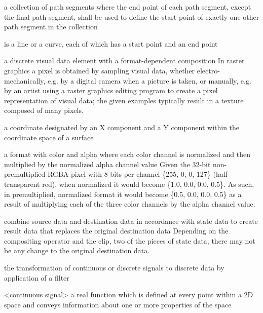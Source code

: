 a collection of path segments where the end point of each path segment, except the final path segment, shall be used to define the start point of exactly one other path segment in the collection

is a line or a curve, each of which has a start point and an end point

a discrete visual data element with a format-dependent composition
\enternote
In raster graphics a pixel is obtained by sampling visual data, whether 
electro-mechanically, e.g. by a digital camera when a picture is taken, or 
manually, e.g. by an artist using a raster graphics editing program to create a 
pixel representation of visual data; the given examples typically result in a 
texture composed of many pixels.
\exitnote

a coordinate designated by an X component and a Y component within the 
coordinate space of a surface

a format with color and alpha where each color channel is normalized and then 
multiplied by the normalized alpha channel value
\enterexample
Given the 32-bit non-premultiplied RGBA pixel with 8 bits per channel \{255, 0, 
0, 127\} (half-transparent red), when normalized it would become \{1.0, 0.0, 
0.0, 0.5\}. As such, in premultiplied, normalized format it would become \{0.5, 
0.0, 0.0, 0.5\} as a result of multiplying each of the three color channels by 
the alpha channel value.
\exitexample

combine source data and destination data in accordance with state data to 
create result data that replaces the original destination data
\enternote
Depending on the compositing operator and the clip, two of the pieces of state 
data, there may not be any change to the original destination data. 
\exitnote

%
the transformation of continuous or discrete signals to discrete 
data by application of a filter

<continuous signal> a real function which is defined at every point within a 
2D space and conveys information about one or more properties of the space

